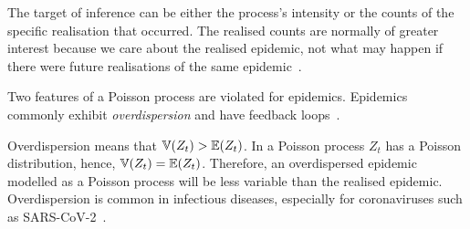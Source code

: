 \documentclass[thesis.tex]{subfiles}
\begin{document}
The target of inference can be either the process's intensity or the counts of the specific realisation that occurred.
The realised counts are normally of greater interest because we care about the realised epidemic, not what may happen if there were future realisations of the same epidemic~\autocite{beckerDependent,brookmeyerMethod}.

Two features of a Poisson process are violated for epidemics.
Epidemics commonly exhibit \emph{overdispersion} and have feedback loops~\autocite{beckerDependent}.

Overdispersion means that $\operatorname{\mathbb{V}}(Z_t) > \operatorname{\mathbb{E}}(Z_t)$.
In a Poisson process $Z_t$ has a Poisson distribution, hence, $\operatorname{\mathbb{V}}(Z_t) = \operatorname{\mathbb{E}}(Z_t)$.
Therefore, an overdispersed epidemic modelled as a Poisson process will be less variable than the realised epidemic.
Overdispersion is common in infectious diseases, especially for coronaviruses such as SARS-CoV-2~\autocite{endoEstimating,adamClustering,mccloskeySARS}.

\end{document}
